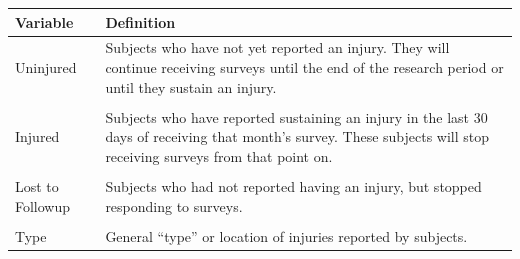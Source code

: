 \documentclass[]{article}
\begin{document}
\begin{longtable}[]{@{}ll@{}}
\toprule
\begin{minipage}[b]{0.16\columnwidth}\raggedright\strut
Variable\strut
\end{minipage} & \begin{minipage}[b]{0.78\columnwidth}\raggedright\strut
Definition\strut
\end{minipage}\tabularnewline
\midrule
\endhead
\begin{minipage}[t]{0.16\columnwidth}\raggedright\strut
Uninjured\strut
\end{minipage} & \begin{minipage}[t]{0.78\columnwidth}\raggedright\strut
Subjects who have not yet reported an injury. They will continue
receiving surveys until the end of the research period or until they
sustain an injury.\strut
\end{minipage}\tabularnewline
\begin{minipage}[t]{0.16\columnwidth}\raggedright\strut
\strut
\end{minipage}\tabularnewline
\begin{minipage}[t]{0.16\columnwidth}\raggedright\strut
Injured\strut
\end{minipage} & \begin{minipage}[t]{0.78\columnwidth}\raggedright\strut
Subjects who have reported sustaining an injury in the last 30 days of
receiving that month's survey. These subjects will stop receiving
surveys from that point on.\strut
\end{minipage}\tabularnewline
\begin{minipage}[t]{0.16\columnwidth}\raggedright\strut
\strut
\end{minipage}\tabularnewline
\begin{minipage}[t]{0.16\columnwidth}\raggedright\strut
Lost to Followup\strut
\end{minipage} & \begin{minipage}[t]{0.78\columnwidth}\raggedright\strut
Subjects who had not reported having an injury, but stopped responding
to surveys.\strut
\end{minipage}\tabularnewline
\begin{minipage}[t]{0.16\columnwidth}\raggedright\strut
\strut
\end{minipage}\tabularnewline
\begin{minipage}[t]{0.16\columnwidth}\raggedright\strut
Type\strut
\end{minipage} & \begin{minipage}[t]{0.78\columnwidth}\raggedright\strut
General ``type'' or location of injuries reported by subjects.\strut
\end{minipage}\tabularnewline
\bottomrule
\end{longtable}
\end{document}
